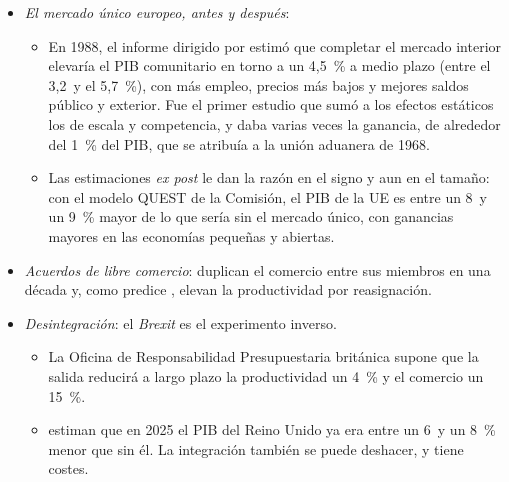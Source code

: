 \documentclass[11pt]{article}
\begin{document}
\begin{itemize}
\item \emph{El mercado único europeo, antes y después}:
  \begin{itemize}
  \item En 1988, el informe dirigido por  estimó que completar el mercado interior elevaría el PIB comunitario en torno a un 4,5~\% a medio plazo (entre el 3,2~y el 5,7~\%), con más empleo, precios más bajos y mejores saldos público y exterior\nocite{Cecchini1988European,Emerson1988Economics,Shigehara1991External}. Fue el primer estudio que sumó a los efectos estáticos los de escala y competencia, y daba varias veces la ganancia, de alrededor del 1~\% del PIB, que se atribuía a la unión aduanera de 1968\nocite{Peck1989Industrial}.
  \item Las estimaciones \emph{ex post} le dan la razón en el signo y aun en el tamaño: con el modelo QUEST de la Comisión, el PIB de la UE es entre un 8~y un 9~\% mayor de lo que sería sin el mercado único, con ganancias mayores en las economías pequeñas y abiertas\nocite{intVeld2019Quantifying,intVeld2019Economic}.
  \end{itemize}
\item \emph{Acuerdos de libre comercio}: duplican el comercio entre sus miembros en una década\nocite{BaierBergstrand2007} y, como predice , elevan la productividad por reasignación\nocite{Trefler2004Long}.
\item \emph{Desintegración}: el \emph{Brexit} es el experimento inverso.
  \begin{itemize}
  \item La Oficina de Responsabilidad Presupuestaria británica supone que la salida reducirá a largo plazo la productividad un 4~\% y el comercio un 15~\%\nocite{OBR2026Brexit}.
  \item \textcite{Bloom2025Economic} estiman que en 2025 el PIB del Reino Unido ya era entre un 6~y un 8~\% menor que sin él. La integración también se puede deshacer, y tiene costes.
  \end{itemize}
\end{itemize}
\end{document}
